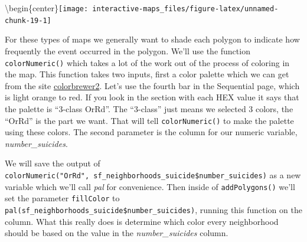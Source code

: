 \documentclass[
  12pt,
]{book}
\newenvironment{Shaded}{\begin{snugshade}}{\end{snugshade}}
\newcommand{\DataTypeTok}[1]{\textcolor[rgb]{0.13,0.29,0.53}{#1}}
\newcommand{\DecValTok}[1]{\textcolor[rgb]{0.00,0.00,0.81}{#1}}
\newcommand{\KeywordTok}[1]{\textcolor[rgb]{0.13,0.29,0.53}{\textbf{#1}}}
\newcommand{\NormalTok}[1]{#1}
\newcommand{\OperatorTok}[1]{\textcolor[rgb]{0.81,0.36,0.00}{\textbf{#1}}}
\newcommand{\StringTok}[1]{\textcolor[rgb]{0.31,0.60,0.02}{#1}}
\begin{document}
\textbackslash begin\{center\}\texttt{[image: interactive-maps\_files/figure-latex/unnamed-chunk-19-1]}

For these types of maps we generally want to shade each polygon to indicate how frequently the event occurred in the polygon. We'll use the function \texttt{colorNumeric()} which takes a lot of the work out of the process of coloring in the map. This function takes two inputs, first a color palette which we can get from the site \href{http://colorbrewer2.org/\#type=sequential\&scheme=OrRd\&n=3}{colorbrewer2}. Let's use the fourth bar in the Sequential page, which is light orange to red. If you look in the section with each HEX value it says that the palette is ``3-class OrRd''. The ``3-class'' just means we selected 3 colors, the ``OrRd'' is the part we want. That will tell \texttt{colorNumeric()} to make the palette using these colors. The second parameter is the column for our numeric variable, \emph{number\_suicides}.

We will save the output of \texttt{colorNumeric("OrRd",\ sf\_neighborhoods\_suicide\$number\_suicides)} as a new variable which we'll call \emph{pal} for convenience. Then inside of \texttt{addPolygons()} we'll set the parameter \texttt{fillColor} to \texttt{pal(sf\_neighborhoods\_suicide\$number\_suicides)}, running this function on the column. What this really does is determine which color every neighborhood should be based on the value in the \emph{number\_suicides} column.

\begin{Shaded}
\end{Shaded}
\end{document}
